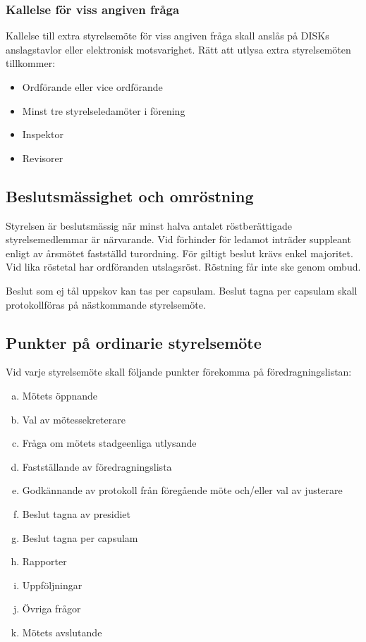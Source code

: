 		\subsubsection{Kallelse för viss angiven fråga}
		\label{subsec:kallelseforvissangivenfraga}
			Kallelse till extra styrelsemöte för viss angiven fråga skall anslås på DISKs anslagstavlor eller elektronisk motsvarighet. Rätt att utlysa extra styrelsemöten tillkommer:
			\begin{itemize}
			\setlength{\itemsep}{0.0cm}
			\setlength{\parskip}{0.0cm}
				\item Ordförande eller vice ordförande
				\item Minst tre styrelseledamöter i förening
				\item Inspektor
				\item Revisorer
			\end{itemize}

\clearpage

	\subsection{Beslutsmässighet och omröstning}
	\label{subsec:beslutsmassighetochomrostning}
		Styrelsen är beslutsmässig när minst halva antalet röstberättigade styrelsemedlemmar är närvarande. Vid förhinder för ledamot inträder suppleant enligt av årsmötet fastställd turordning. För giltigt beslut krävs enkel majoritet. Vid lika röstetal har ordföranden utslagsröst. Röstning får inte ske genom ombud.\par
		Beslut som ej tål uppskov kan tas per capsulam. Beslut tagna per capsulam skall protokollföras på nästkommande styrelsemöte.

	\subsection{Punkter på ordinarie styrelsemöte}
	\label{subsec:punkterpaordinariestyrelsemote}
		Vid varje styrelsemöte skall följande punkter förekomma på föredragningslistan:
		\begin{enumerate}[a.]
		\setlength{\itemsep}{0.0cm}
		\setlength{\parskip}{0.0cm}
			\item Mötets öppnande
			\item Val av mötessekreterare
			\item Fråga om mötets stadgeenliga utlysande
			\item Fastställande av föredragningslista
			\item Godkännande av protokoll från föregående möte och/eller val av justerare
			\item Beslut tagna av presidiet
			\item Beslut tagna per capsulam
			\item Rapporter
			\item Uppföljningar
		\setcounter{enumi}{24}
			\item Övriga frågor
			\item Mötets avslutande
		\end{enumerate}

